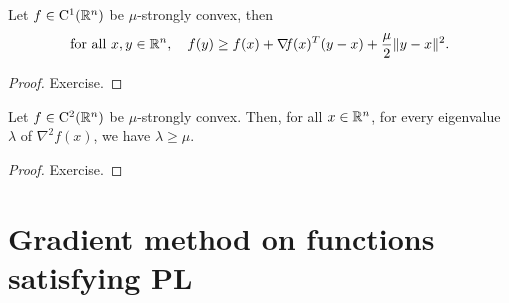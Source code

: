 \documentclass[10pt,a4paper]{article}
\begin{document}
\begin{lemma}
	Let $f \in \mathord{\mathrm{C^1}}(\mathbb{R}^n)$ be $\mu$-strongly convex, then
	\begin{equation}
		\text{for all } x, y \in \mathbb{R}^n, \quad f(y) \geq f(x) + \operatorname*{\mathit{\nabla \!f}}(x)^T(y - x) + \frac{\mu}{2}\|y - x\|^2.
	\end{equation}
\end{lemma}

\begin{proof}
	Exercise.
\end{proof} 

\begin{lemma}Let $f\in \mathord{\mathrm{C^2}}(\mathbb{R}^n)$ be $\mu$-strongly convex. Then, for all $x \in \mathbb{R}^n$, for every eigenvalue $\lambda$ of $\nabla^2 f(x)$, we have $\lambda \geq \mu$.
\end{lemma}

\begin{proof}
	Exercise.
\end{proof}


\section{Gradient method on functions satisfying PL}
\end{document}
